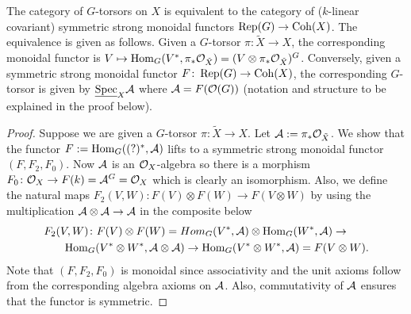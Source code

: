 \documentclass[12pt]{amsart}
\begin{document}
\begin{theorem}  \label{thm:torsorviamonoid}
The category of $G$-torsors on $X$ is equivalent to the category of ($k$-linear covariant) symmetric strong monoidal functors $\operatorname{Rep}(G) \to \operatorname{Coh}(X)$. The equivalence is given as follows. Given a $G$-torsor $\pi \colon \tilde{X} \to X$, the corresponding monoidal functor is $V \mapsto \operatorname{Hom}_G(V^*, \pi_* \mathcal{O}_{\tilde{X}}) = (V \otimes \pi_*\mathcal{O}_{\tilde{X}})^G$. Conversely, given a symmetric strong monoidal functor $F \colon \operatorname{Rep}(G) \to \operatorname{Coh}(X)$, the corresponding $G$-torsor is given by $\underline{\operatorname{Spec}}_X \mathcal{A}$ where $\mathcal{A} = F(\mathcal{O}(G))$ (notation and structure to be explained in the proof below). 
\end{theorem}
\begin{proof}
Suppose we are given a $G$-torsor $\pi \colon \tilde{X} \to X$. Let $\mathcal{A} := \pi_* \mathcal{O}_{\tilde{X}}$. We show that the functor $F:= \operatorname{Hom}_G((?)^*,\mathcal{A})$ lifts to a symmetric strong monoidal functor $(F,F_2,F_0)$. Now $\mathcal{A}$ is an $\mathcal{O}_{X}$-algebra so there is a morphism $F_0\colon \mathcal{O}_X \to F(k) = \mathcal{A}^G = \mathcal{O}_X$ which is clearly an isomorphism. Also, we define the natural maps $F_2(V,W) \colon F(V) \otimes F(W) \to F(V \otimes W)$ by using the multiplication $\mathcal{A} \otimes \mathcal{A} \to \mathcal{A}$ in the composite below
\[\begin{split} 
F_2(V,W) \colon F(V) \otimes F(W) = Hom_G(V^*,\mathcal{A}) \otimes \operatorname{Hom}_G(W^*, \mathcal{A}) \to \quad \quad \\
\quad \quad \operatorname{Hom}_G(V^* \otimes W^*, \mathcal{A} \otimes \mathcal{A}) \to \operatorname{Hom}_G(V^* \otimes W^*, \mathcal{A}) = F(V \otimes W).
\end{split}\]
Note that $(F,F_2,F_0)$ is monoidal since associativity and the unit axioms follow from the corresponding algebra axioms on $\mathcal{A}$. Also, commutativity of $\mathcal{A}$ ensures that the functor is symmetric. 


\end{proof}
\end{document}

